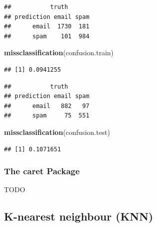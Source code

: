 \documentclass[]{book}
\newenvironment{Shaded}{\begin{snugshade}}{\end{snugshade}}
\newcommand{\KeywordTok}[1]{\textcolor[rgb]{0.13,0.29,0.53}{\textbf{#1}}}
\newcommand{\DataTypeTok}[1]{\textcolor[rgb]{0.13,0.29,0.53}{#1}}
\newcommand{\DecValTok}[1]{\textcolor[rgb]{0.00,0.00,0.81}{#1}}
\newcommand{\StringTok}[1]{\textcolor[rgb]{0.31,0.60,0.02}{#1}}
\newcommand{\CommentTok}[1]{\textcolor[rgb]{0.56,0.35,0.01}{\textit{#1}}}
\newcommand{\OperatorTok}[1]{\textcolor[rgb]{0.81,0.36,0.00}{\textbf{#1}}}
\newcommand{\NormalTok}[1]{#1}
\theoremstyle{definition}
\theoremstyle{definition}
\theoremstyle{definition}
\theoremstyle{remark}
\begin{document}
\begin{verbatim}
##           truth
## prediction email spam
##      email  1730  181
##      spam    101  984
\end{verbatim}

\begin{Shaded}
\begin{Highlighting}[]
\KeywordTok{missclassification}\NormalTok{(confusion.train)}
\end{Highlighting}
\end{Shaded}

\begin{verbatim}
## [1] 0.0941255
\end{verbatim}

\begin{Shaded}
\end{Shaded}

\begin{verbatim}
##           truth
## prediction email spam
##      email   882   97
##      spam     75  551
\end{verbatim}

\begin{Shaded}
\begin{Highlighting}[]
\KeywordTok{missclassification}\NormalTok{(confusion.test)}
\end{Highlighting}
\end{Shaded}

\begin{verbatim}
## [1] 0.1071651
\end{verbatim}

\subsubsection{The caret Package}\label{the-caret-package}

TODO

\subsection{K-nearest neighbour (KNN)}\label{k-nearest-neighbour-knn}
\end{document}

